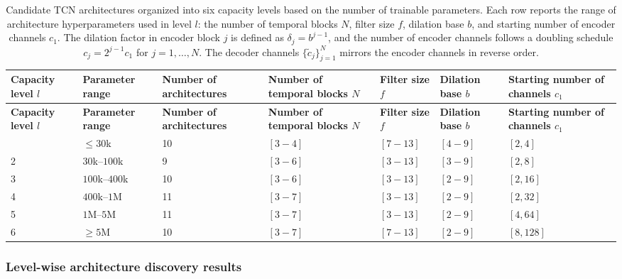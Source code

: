 \documentclass[preprint,12pt]{elsarticle}
\begin{document}
\begin{footnotesize}
\setlength{\tabcolsep}{5pt}
\renewcommand{\arraystretch}{1.3}
\begin{longtable}{p{1.8cm}p{1.8cm}p{2.0cm}p{2.0cm}p{1.6cm}p{1.8cm}p{2.0cm}}
\caption{Candidate TCN architectures organized into six capacity levels based on the number of trainable parameters. Each row reports the range of architecture hyperparameters used in level $l$: the number of temporal blocks $N$, filter size $f$, dilation base $b$, and starting number of encoder channels $c_1$. The dilation factor in encoder block $j$ is defined as $\delta_j = b^{j-1}$, and the number of encoder channels follows a doubling schedule $c_j = 2^{j-1} c_1$ for $j = 1, \dots, N$. The decoder channels $\{\tilde{c}_j\}_{j=1}^{N}$ mirrors the encoder channels in reverse order.}
\label{tab:arch_level}\\
\toprule
\textbf{Capacity level $l$} & \textbf{Parameter range} & \textbf{Number of architectures} & \textbf{Number of temporal blocks $N$} & \textbf{Filter size $f$} & \textbf{Dilation base $b$} & \textbf{Starting number of channels $c_1$} \\
\midrule
\endfirsthead
\toprule
\textbf{Capacity level $l$} & \textbf{Parameter range} & \textbf{Number of architectures} & \textbf{Number of temporal blocks $N$} & \textbf{Filter size $f$} & \textbf{Dilation base $b$} & \textbf{Starting number of channels $c_1$} \\
\midrule
\endhead
\endfoot
\bottomrule
\endlastfoot
1 & $\le 30$k      & 10 & $[3-4]$          & $[7- 13]$ & $[4- 9]$ & $[2, 4]$     \\
2 & $30$k--$100$k  &  9 & $[3- 6]$    & $[3- 13]$ & $[3- 9]$ & $[2, 8]$     \\
3 & $100$k--$400$k & 10 & $[3- 6]$    & $[3- 13]$ & $[2- 9]$ & $[2, 16]$    \\
4 & $400$k--$1$M   & 11 & $[3- 7]$ & $[3- 13]$ & $[2- 9]$ & $[2, 32]$    \\
5 & $1$M--$5$M     & 11 & $[3- 7]$ & $[3- 13]$ & $[2- 9]$ & $[4, 64]$    \\
6 & $\ge 5$M       & 10 & $[3- 7]$ & $[7- 13]$ & $[2-9]$ & $[8, 128]$   \\
\end{longtable}
\end{footnotesize}




\subsubsection{Level-wise architecture discovery results}
\end{document}
